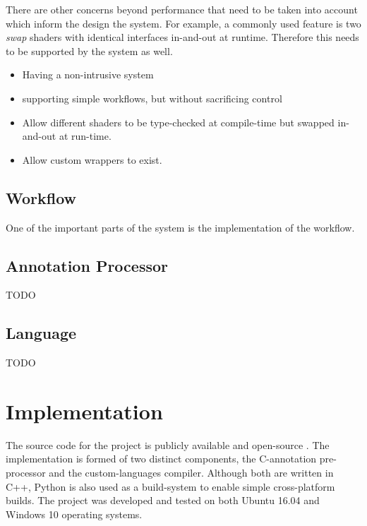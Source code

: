 \documentclass[a4paper,12pt,twoside,openright]{report}
\begin{document}
There are other concerns beyond performance that need to be taken into account
which inform the design the system. For example, a commonly used feature is two
\textit{swap} shaders with identical interfaces in-and-out at runtime.
Therefore this needs to be supported by the system as well.

\begin{itemize}

    \item Having a non-intrusive system

    \item supporting simple workflows, but without sacrificing control

    \item Allow different shaders to be type-checked at compile-time but
    swapped in-and-out at run-time.

    \item Allow custom wrappers to exist.

\end{itemize}

\section{Workflow}

One of the important parts of the system is the implementation of the workflow.

\section{Annotation Processor}

TODO

\section{Language}

TODO

\chapter{Implementation}


The source code for the project is publicly available and open-source
\cite{ProjectSource}. The implementation is formed of two distinct components,
the C-annotation pre-processor and the custom-languages compiler. Although both
are written in C++, Python is also used as a build-system to enable simple
cross-platform builds. The project was developed and tested on both Ubuntu
16.04 and Windows 10 operating systems.
\end{document}
